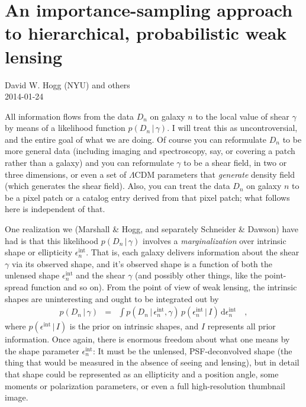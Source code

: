 \documentclass[12pt]{article}
\newcommand{\given}{\,|\,}
\newcommand{\data}{D}
\newcommand{\shear}{\gamma}
\newcommand{\ellip}{\epsilon}
\newcommand{\intrinsic}{\ellip^{\mathrm{int}}}
\newcommand{\prior}{I}
\newcommand{\dd}{\mathrm{d}}
\begin{document}
\sloppy\sloppypar

\section*{An importance-sampling approach to hierarchical, probabilistic weak lensing}

\smallskip\noindent
David W. Hogg (NYU) and others\\
2014-01-24

\bigskip

All information flows from the data $\data_n$ on galaxy $n$ to the local value of shear $\shear$
  by means of a likelihood function $p(\data_n\given\shear)$.
I will treat this as uncontroversial, and the entire goal of what we are doing.
Of course you can reformulate $\data_n$ to be more general data
  (including imaging and spectroscopy, say, or covering a patch rather than a galaxy)
  and you can reformulate $\gamma$ to be a shear field, in two or three dimensions,
  or even a set of $\Lambda$CDM parameters that \emph{generate} density field
  (which generates the shear field).
Also, you can treat the data $\data_n$ on galaxy $n$ to be a pixel patch
  or a catalog entry derived from that pixel patch;
  what follows here is independent of that.

One realization we (Marshall \& Hogg, and separately Schneider \& Dawson) have had is
  that this likelihood $p(\data_n\given\shear)$ involves a \emph{marginalization}
  over intrinsic shape or ellipticity $\intrinsic_n$.
That is, each galaxy delivers information about the shear $\gamma$ via its observed shape,
  and it's observed shape is a function of both the unlensed shape $\intrinsic_n$
  and the shear $\gamma$ (and possibly other things, like the point-spread function and so on).
From the point of view of weak lensing, the intrinsic shapes are uninteresting and ought to be integrated out by
\begin{eqnarray}
p(\data_n\given\shear)
  &=& \int p(\data_n\given\intrinsic_n,\shear)\,p(\intrinsic_n\given\prior)\,\dd\intrinsic_n
  \quad ,
\end{eqnarray}
  where $p(\intrinsic\given\prior)$ is the prior on intrinsic shapes,
  and $\prior$ represents all prior information.
Once again, there is enormous freedom about what one means by the shape parameter $\intrinsic_n$:
It must be the unlensed, PSF-deconvolved shape
  (the thing that would be measured in the absence of seeing and lensing),
  but in detail that shape could be represented as an ellipticity and a position angle,
  some moments or polarization parameters,
  or even a full high-resolution thumbnail image.
\end{document}
